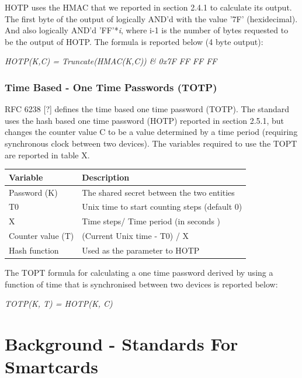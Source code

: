 \documentclass[bsc,frontabs,twoside,singlespacing,parskip,deptreport]{infthesis}     %
\begin{document}
HOTP uses the HMAC that we reported in section 2.4.1 to calculate its output. The first byte of the output of logically AND'd with the value '7F' (hexidecimal). And also logically AND'd 'FF'*\textit{i}, where i-1 is the number of bytes requested to be the output of HOTP. The formula is reported below (4 byte output):
\begin{center}
\textit{HOTP(K,C) = Truncate(HMAC(K,C)) \& 0x7F FF FF FF}
\end{center}

\subsection{Time Based - One Time Passwords (TOTP)}
RFC 6238 [?] defines the time based one time password (TOTP). The standard uses the hash based one time password (HOTP) reported in section 2.5.1, but changes the counter value C to be a value determined by a time period (requiring synchronous clock between two devices). The variables required to use the TOPT are reported in table X.

\begin{table}[H]
\begin{tabular}{|l|p{10cm}|}
\hline
Variable & Description\\
\hline
Password (K) & The shared secret between the two entities\\
\hline
T0 & Unix time to start counting steps (default 0)\\
\hline
X & Time steps/ Time period  (in seconds )\\
\hline
Counter value (T) & (Current Unix time - T0) / X\\
\hline
Hash function & Used as the parameter to HOTP\\
\hline
\end{tabular}
\end{table}

The TOPT formula for calculating a one time password derived by using a function of time that is synchronised between two devices is reported below:

\begin{center}
\textit{ TOTP(K, T) = HOTP(K, C)}
\end{center}


\chapter{Background - Standards For Smartcards}
\end{document}
